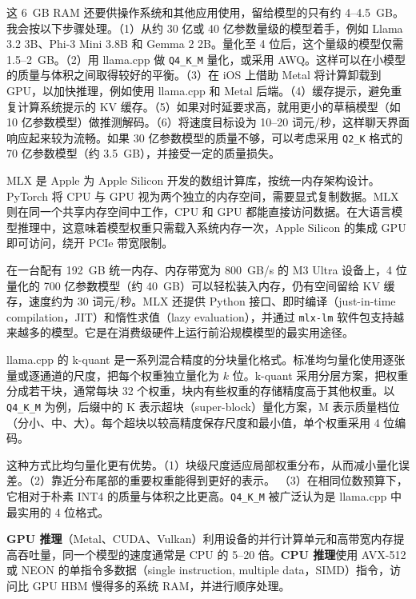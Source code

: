 \begin{interview}
这 6~GB RAM 还要供操作系统和其他应用使用，留给模型的只有约 4–4.5~GB。我会按以下步骤处理。（1）从约 30 亿或 40 亿参数量级的模型着手，例如 Llama 3.2 3B、Phi-3 Mini 3.8B 和 Gemma 2 2B。量化至 4 位后，这个量级的模型仅需 1.5–2~GB。（2）用 llama.cpp 做 \texttt{Q4\_K\_M} 量化，或采用 AWQ。这样可以在小模型的质量与体积之间取得较好的平衡。（3）在 iOS 上借助 Metal 将计算卸载到 GPU，以加快推理，例如使用 llama.cpp 和 Metal 后端。（4）缓存提示，避免重复计算系统提示的 KV 缓存。（5）如果对时延要求高，就用更小的草稿模型（如 10 亿参数模型）做推测解码。（6）将速度目标设为 10–20 词元/秒，这样聊天界面响应起来较为流畅。如果 30 亿参数模型的质量不够，可以考虑采用 \texttt{Q2\_K} 格式的 70 亿参数模型（约 3.5~GB），并接受一定的质量损失。

MLX 是 Apple 为 Apple Silicon 开发的数组计算库，按统一内存架构设计。PyTorch 将 CPU 与 GPU 视为两个独立的内存空间，需要显式复制数据。MLX 则在同一个共享内存空间中工作，CPU 和 GPU 都能直接访问数据。在大语言模型推理中，这意味着模型权重只需载入系统内存一次，Apple Silicon 的集成 GPU 即可访问，绕开 PCIe 带宽限制。

在一台配有 192~GB 统一内存、内存带宽为 800~GB/s 的 M3 Ultra 设备上，4 位量化的 700 亿参数模型（约 40~GB）可以轻松装入内存，仍有空间留给 KV 缓存，速度约为 30 词元/秒。MLX 还提供 Python 接口、即时编译（just-in-time compilation，JIT）和惰性求值（lazy evaluation），并通过 \texttt{mlx-lm} 软件包支持越来越多的模型。它是在消费级硬件上运行前沿规模模型的最实用途径。

llama.cpp 的 k-quant 是一系列混合精度的分块量化格式。标准均匀量化使用逐张量或逐通道的尺度，把每个权重独立量化为 \(k\) 位。k-quant 采用分层方案，把权重分成若干块，通常每块 32 个权重，块内有些权重的存储精度高于其他权重。以 \texttt{Q4\_K\_M} 为例，后缀中的 K 表示超块（super-block）量化方案，M 表示质量档位（分小、中、大）。每个超块以较高精度保存尺度和最小值，单个权重采用 4 位编码。

这种方式比均匀量化更有优势。（1）块级尺度适应局部权重分布，从而减小量化误差。\mbox{（2）靠近分布尾部}的重要权重能得到更好的表示。
（3）在相同位数预算下，它相对于朴素 INT4 的质量与体积之比更高。\texttt{Q4\_K\_M} 被广泛认为是 llama.cpp 中最实用的 4 位格式。

\textbf{GPU 推理}（Metal、CUDA、Vulkan）利用设备的并行计算单元和高带宽内存提高吞吐量，同一个模型的速度通常是 CPU 的 5–20 倍。\textbf{CPU 推理}使用 AVX-512 或 NEON 的单指令多数据（single instruction, multiple data，SIMD）指令，访问比 GPU HBM 慢得多的系统 RAM，并进行顺序处理。


\end{interview}
